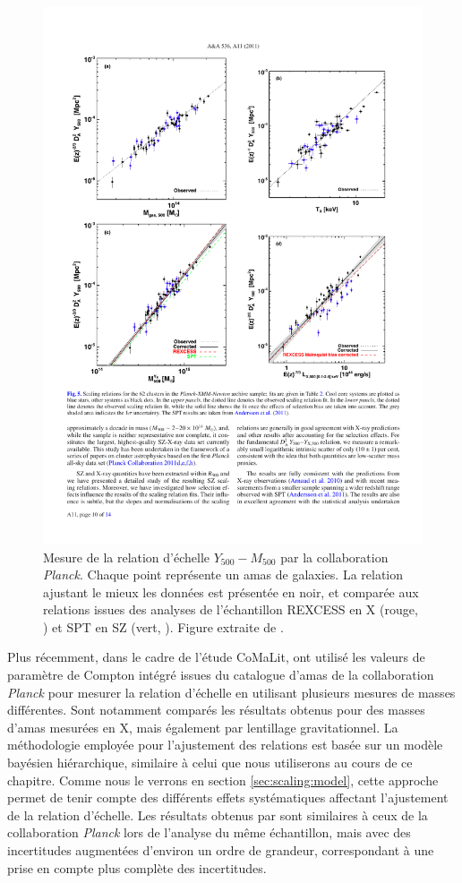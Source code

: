 \begin{figure}[t]
    \centering
    \includegraphics[width=.5\linewidth]{Figures/Chap_scaling/planck.pdf}
    \caption{
        Mesure de la relation d'échelle $Y_{500}-M_{500}$ par la collaboration \textit{Planck}.
        Chaque point représente un amas de galaxies.
        La relation ajustant le mieux les données est présentée en noir, et comparée aux relations issues des analyses de l'échantillon REXCESS en X (rouge, \cite{arnaud_universal_2010}) et SPT en SZ (vert, \cite{andersson_x-ray_2011}).
        Figure extraite de \cite{planck_collaboration_planck_2011}.
    }
    \label{fig:scaling:planck}
\end{figure}

Plus récemment, dans le cadre de l'étude CoMaLit,  ont utilisé les valeurs de paramètre de Compton intégré issues du catalogue d'amas de la collaboration \textit{Planck} pour mesurer la relation d'échelle en utilisant plusieurs mesures de masses différentes.
Sont notamment comparés les résultats obtenus pour des masses d'amas mesurées en X, mais également par lentillage gravitationnel.
La méthodologie employée pour l'ajustement des relations est basée sur un modèle bayésien hiérarchique, similaire à celui que nous utiliserons au cours de ce chapitre.
Comme nous le verrons en section \ref{sec:scaling:model}, cette approche permet de tenir compte des différents effets systématiques affectant l'ajustement de la relation d'échelle.
Les résultats obtenus par  sont similaires à ceux de la collaboration \textit{Planck} lors de l'analyse du même échantillon, mais avec des incertitudes augmentées d'environ un ordre de grandeur, correspondant à une prise en compte plus complète des incertitudes.


